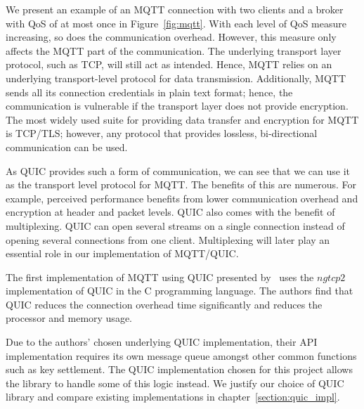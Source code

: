 We present an example of an MQTT connection with two clients and a broker with QoS of at most once in Figure~\ref{fig:mqtt}.
With each level of QoS measure increasing, so does the communication overhead.
However, this measure only affects the MQTT part of the communication.
The underlying transport layer protocol, such as TCP, will still act as intended.
Hence, MQTT relies on an underlying transport-level protocol for data transmission.
Additionally, MQTT sends all its connection credentials in plain text format; hence, the communication is vulnerable if the transport layer does not provide encryption.
The most widely used suite for providing data transfer and encryption for MQTT is TCP/TLS; however, any protocol that provides lossless, bi-directional communication can be used.

As QUIC provides such a form of communication, we can see that we can use it as the transport level protocol for MQTT.
The benefits of this are numerous.
For example, perceived performance benefits from lower communication overhead and encryption at header and packet levels.
QUIC also comes with the benefit of multiplexing.
QUIC can open several streams on a single connection instead of opening several connections from one client.
Multiplexing will later play an essential role in our implementation of MQTT/QUIC.

The first implementation of MQTT using QUIC presented by~\cite{kumar_implementation_2019} uses the $ngtcp2$ implementation of QUIC in the C programming language.
The authors find that QUIC reduces the connection overhead time significantly and reduces the processor and memory usage.

Due to the authors' chosen underlying QUIC implementation, their API implementation requires its own message queue amongst other common functions such as key settlement.
The QUIC implementation chosen for this project allows the library to handle some of this logic instead.
We justify our choice of QUIC library and compare existing implementations in chapter~\ref{section:quic_impl}.